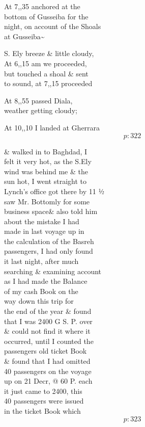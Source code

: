 \documentclass{report}
\begin{document}
	\par{
 	At 7,,35 anchored at the\ \\bottom of Gusseiba for the\ \\night, on account of the Shoals\ \\at Gusseiba\~{}\ \\
	}

	\par{
 	S. Ely breeze \& little cloudy,\ \\At 6,,15 am we proceeded,\ \\but touched a shoal \& sent\ \\to sound, at 7,,15 proceeded\ \\
	}

	\par{
 	At 8,,55 passed Diala,\ \\weather getting cloudy;\ \\
	}

	\par{
 	At 10,,10 I landed at Gherrara\ \\
  \[p: 322 \]

	}

	\par{
 	\& walked in to Baghdad, I\ \\felt it very hot, as the S.Ely\ \\wind was behind me \& the\ \\sun hot, I went straight to\ \\Lynch’s office got there by 11 ½\ \\saw Mr. Bottomly for some\ \\business \lbrack space\rbrack \& also told him\ \\about the mistake I had\ \\made in last voyage up in\ \\the calculation of the Basreh\ \\passengers, I had only found\ \\it last night, after much\ \\searching \& examining account\ \\as I had made the Balance\ \\of my cash Book on the\ \\way down this trip for\ \\the end of the year \& found\ \\that I was 2400 G S. P. over\ \\\& could not find it where it\ \\occurred, until I counted the\ \\passengers old ticket Book\ \\\& found that I had omitted\ \\40 passengers on the voyage\ \\up on 21 Decr, @ 60 P. each\ \\it just came to 2400, this\ \\40 passengers were issued\ \\in the ticket Book which\ \\
  \[p: 323 \]

	}
\end{document}
